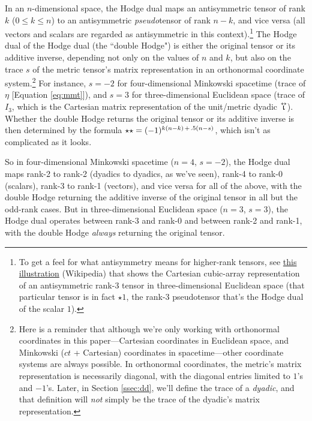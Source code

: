 \documentclass[12pt]{article}
\newcommand{\tightoverset}[2]{%
  \mathop{#2}\limits^{\vbox to -.5ex{\kern-0.75ex\hbox{$#1$}\vss}}}
\newcommand{\inlinedy}[1]{\tightoverset{\text{\tiny$\bm\leftrightarrow$}}{#1}}
\begin{document}
In an $n$-dimensional space, the Hodge dual maps an antisymmetric tensor of rank $k$ ($0 \leq k \leq n$) to an antisymmetric \emph{pseudo}tensor of rank $n - k$, and vice versa (all vectors and scalars are regarded as antisymmetric in this context).\footnote{To get a feel for what antisymmetry means for higher-rank tensors, see \href{https://en.wikipedia.org/wiki/Levi-Civita_symbol\#/media/File:Epsilontensor.svg}{this illustration} (Wikipedia) that shows the Cartesian cubic-array representation of an antisymmetric rank-3 tensor in three-dimensional Euclidean space (that particular tensor is in fact $\star 1$, the rank-3 pseudotensor that's the Hodge dual of the scalar $1$).} The Hodge dual of the Hodge dual (the ``double Hodge") is either the original tensor or its additive inverse, depending not only on the values of $n$ and $k$, but also on the trace $s$ of the metric tensor's matrix representation in an orthonormal coordinate system.\footnote{Here is a reminder that although we're only working with orthonormal coordinates in this paper---Cartesian coordinates in Euclidean space, and Minkowski ($ct$ + Cartesian) coordinates in spacetime---other coordinate systems are always possible. In orthonormal coordinates, the metric's matrix representation is necessarily diagonal, with the diagonal entries limited to $1$'s and $-1$'s. Later, in Section \ref{ssec:dd}, we'll define the trace of a \emph{dyadic}, and that definition will \emph{not} simply be the trace of the dyadic's matrix representation.} For instance, $s = -2$ for four-dimensional Minkowski spacetime (trace of $\eta$ [Equation \ref{eq:mmt}]), and $s = 3$ for three-dimensional Euclidean space (trace of $I_3$, which is the Cartesian matrix representation of the unit/metric dyadic $\inlinedy{\upiota}$). Whether the double Hodge returns the original tensor or its additive inverse is then determined by the formula $\star \star = (-1)^{k(n-k) \mkern2.5mu + \mkern2mu .5(n-s)}$, which isn't as complicated as it looks.

So in four-dimensional Minkowski spacetime ($n = 4$, $s = -2$), the Hodge dual maps rank-2 to rank-2 (dyadics to dyadics, as we've seen), rank-4 to rank-0 (scalars), rank-3 to rank-1 (vectors), and vice versa for all of the above, with the double Hodge returning the additive inverse of the original tensor in all but the odd-rank cases. But in three-dimensional Euclidean space ($n = 3$, $s = 3$), the Hodge dual operates between rank-3 and rank-0 and between rank-2 and rank-1, with the double Hodge \emph{always} returning the original tensor.
\end{document}
